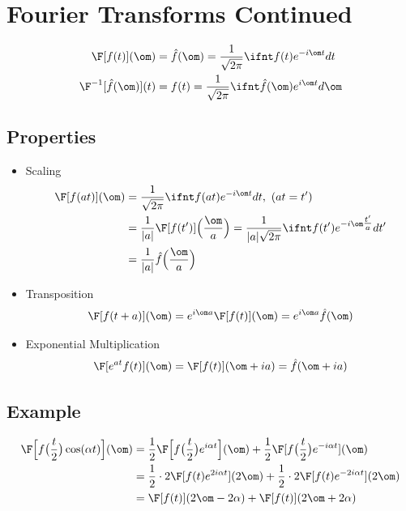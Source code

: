 \documentclass[a4paper, 11pt, normalem]{report}
\begin{document}
\section{Fourier Transforms Continued}
\begin{align*}
    \F[f(t)](\om) &= \hat{f}(\om) = \frac{1}{\sqrt{2\pi}} \ifnt f(t)e^{-i\om t}dt \\
    \F^{-1}[\hat{f}(\om)](t) &= f(t) = \frac{1}{\sqrt{2\pi}} \ifnt \hat{f}(\om)e^{i\om t}d\om
\end{align*}

\subsection{Properties}
\begin{itemize}
    \item Scaling
            \begin{align*}
                \F[f(at)](\om) &= \frac{1}{\sqrt{2\pi}} \ifnt f(at)e^{-i\om t}dt, ~(at = t') \\
                &= \frac{1}{|a|} \F[f(t')]\Big(\frac{\om}{a}\Big) = \frac{1}{|a|\sqrt{2\pi}} \ifnt f(t') e^{-i\om \tfrac{t'}{a}}dt' \\
                &= \frac{1}{|a|} \hat{f}\Big(\frac{\om}{a}\Big)
            \end{align*}
    \item Transposition
            \begin{equation*}
                \F[f(t + a)](\om) = e^{i\om a} \F[f(t)](\om) = e^{i\om a}\hat{f}(\om)
            \end{equation*}
    \item Exponential Multiplication
            \begin{equation*}
                \F[e^{at}f(t)](\om) = \F[f(t)](\om + ia) = \hat{f}(\om + ia)
            \end{equation*}
\end{itemize}
\subsection{Example}
\begin{align*}
    \F\Big[f\big(\frac{t}{2}\big)\cos(\alpha t)\Big](\om) &= \frac{1}{2}\F\Big[f\big(\frac{t}{2}\big)e^{i\alpha t}\Big](\om) + \frac{1}{2}\F[f\big(\frac{t}{2}\big)e^{-i\alpha t}](\om) \\
    &= \frac{1}{2}\cdot2 \F[f(t)e^{2i\alpha t}](2\om) + \frac{1}{2}\cdot2 \F[f(t)e^{-2i\alpha t}](2\om) \\
    &= \F[f(t)](2\om - 2\alpha) + \F[f(t)](2\om + 2\alpha)
\end{align*}
\end{document}
